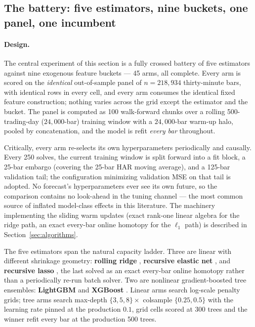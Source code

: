 \subsection{The battery: five estimators, nine buckets, one panel, one incumbent}
\label{sec:linvsnonlin_battery}

\paragraph{Design.}
The central experiment of this section is a fully crossed battery of five
estimators against nine exogenous feature buckets --- 45 arms, all complete.
Every arm is scored on the \emph{identical} out-of-sample panel of
$n = 218{,}934$ thirty-minute bars, with identical rows in every cell, and every
arm consumes the identical fixed feature construction; nothing varies across the
grid except the estimator and the bucket. The panel is computed as 100
walk-forward chunks over a rolling 500-trading-day ($24{,}000$-bar) training
window with a $24{,}000$-bar warm-up halo, pooled by concatenation, and the model
is refit \emph{every bar} throughout.

Critically, every arm re-selects its own hyperparameters periodically and
causally. Every 250 solves, the current training window is split forward into a
fit block, a 25-bar embargo (covering the 25-bar HAR moving average), and a
125-bar validation tail; the configuration minimizing validation MSE on that tail
is adopted. No forecast's hyperparameters ever see its own future, so the
comparison contains no look-ahead in the tuning channel --- the most common
source of inflated model-class effects in this literature. The machinery
implementing the sliding warm updates (exact rank-one linear algebra for the
ridge path, an exact every-bar online homotopy for the $\ell_1$ path) is
described in Section~\ref{sec:algorithms}.

The five estimators span the natural capacity ladder. Three are linear with
different shrinkage geometry: \textbf{rolling ridge} \citep{HoerlKennard1970},
\textbf{recursive elastic net} \citep{ZouHastie2005}, and \textbf{recursive
lasso} \citep{Tibshirani1996}, the last solved as an exact every-bar online
homotopy rather than a periodically re-run batch solver. Two are nonlinear
gradient-boosted tree ensembles: \textbf{LightGBM} \citep{Ke2017} and
\textbf{XGBoost} \citep{Chen2016}. Linear arms search log-scale penalty grids;
tree arms search max-depth $\{3,5,8\} \times$ colsample $\{0.25, 0.5\}$ with the
learning rate pinned at the production $0.1$, grid cells scored at 300 trees and
the winner refit every bar at the production 500 trees.

